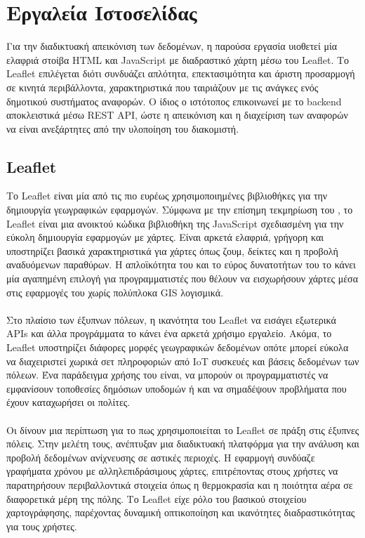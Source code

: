 \section{Εργαλεία Ιστοσελίδας}
Για την διαδικτυακή απεικόνιση των δεδομένων, η παρούσα εργασία υιοθετεί μία ελαφριά στοίβα HTML και JavaScript με διαδραστικό χάρτη μέσω του Leaflet. Το Leaflet επιλέγεται διότι συνδυάζει απλότητα, επεκτασιμότητα και άριστη προσαρμογή σε κινητά περιβάλλοντα, χαρακτηριστικά που ταιριάζουν με τις ανάγκες ενός δημοτικού συστήματος αναφορών. Ο ίδιος ο ιστότοπος επικοινωνεί με το backend αποκλειστικά μέσω REST API, ώστε η απεικόνιση και η διαχείριση των αναφορών να είναι ανεξάρτητες από την υλοποίηση του διακομιστή.

\subsection{Leaflet}
Το Leaflet είναι μία από τις πιο ευρέως χρησιμοποιημένες βιβλιοθήκες για την δημιουργία γεωγραφικών εφαρμογών. Σύμφωνα με την επίσημη τεκμηρίωση του \parencite{Leaflet}, το Leaflet είναι μια ανοικτού κώδικα βιβλιοθήκη της JavaScript σχεδιασμένη για την εύκολη δημιουργία εφαρμογών με χάρτες. Είναι αρκετά ελαφριά, γρήγορη και υποστηρίζει βασικά χαρακτηριστικά για χάρτες όπως ζουμ, δείκτες και η προβολή αναδυόμενων παραθύρων. Η απλοϊκότητα του και το εύρος δυνατοτήτων του το κάνει μία αγαπημένη επιλογή για προγραμματιστές που θέλουν να εισχωρήσουν χάρτες μέσα στις εφαρμογές του χωρίς πολύπλοκα GIS λογισμικά. 
\\
\\
Στο πλαίσιο των έξυπνων πόλεων, η ικανότητα του Leaflet να εισάγει εξωτερικά APIs και άλλα προγράμματα το κάνει ένα αρκετά χρήσιμο εργαλείο. Ακόμα, το Leaflet υποστηρίζει διάφορες μορφές γεωγραφικών δεδομένων οπότε μπορεί εύκολα να διαχειριστεί χωρικά σετ πληροφοριών από IoT συσκευές και βάσεις δεδομένων των πόλεων. Ένα παράδειγμα χρήσης του είναι, να μπορούν οι προγραμματιστές να εμφανίσουν τοποθεσίες δημόσιων υποδομών ή και να σημαδέψουν προβλήματα που έχουν καταχωρήσει οι πολίτες.
\\
\\
Οι \textcite{karampakakis2025web} δίνουν μια περίπτωση για το πως χρησιμοποιείται το Leaflet σε πράξη στις έξυπνες πόλεις. Στην μελέτη τους, ανέπτυξαν μια διαδικτυακή πλατφόρμα για την ανάλυση και προβολή δεδομένων ανίχνευσης σε αστικές περιοχές. Η εφαρμογή συνδύαζε γραφήματα χρόνου με αλληλεπιδράσιμους χάρτες, επιτρέποντας στους χρήστες να παρατηρήσουν περιβαλλοντικά στοιχεία όπως η θερμοκρασία και η ποιότητα αέρα σε διαφορετικά μέρη της πόλης. Το Leaflet είχε ρόλο του βασικού στοιχείου χαρτογράφησης, παρέχοντας δυναμική οπτικοποίηση και ικανότητες διαδραστικότητας για τους χρήστες.
